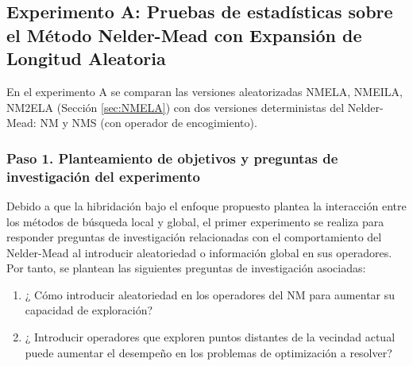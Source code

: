  \subsection{Experimento A: Pruebas de estadísticas sobre el Método Nelder-Mead con Expansión de Longitud Aleatoria}\label{sec:Experimento A: Pruebas de estadísticas sobre el Método Nelder-Mead con Expansión de Longitud Aleatoria}
En el experimento A se comparan las versiones aleatorizadas NMELA, NMEILA, NM2ELA (Sección \ref{sec:NMELA}) con dos versiones deterministas del Nelder-Mead: NM y NMS (con operador de encogimiento).

 \subsubsection{Paso 1. Planteamiento de objetivos y preguntas de investigación del experimento}
  Debido a que la hibridación bajo el enfoque propuesto plantea la interacción entre los métodos de búsqueda local y global, el primer experimento se realiza para responder preguntas de investigación relacionadas con el comportamiento del Nelder-Mead al introducir aleatoriedad o información global en sus operadores. Por tanto, se plantean las siguientes preguntas de investigación asociadas:
 \begin{enumerate}
 	\item ¿ Cómo introducir aleatoriedad en los operadores del NM para aumentar su capacidad de exploración?
 	\item ¿ Introducir operadores que exploren puntos distantes de la vecindad actual puede aumentar el desempeño en los problemas de optimización a resolver?
 
 \end{enumerate}

